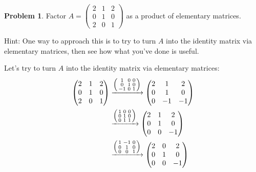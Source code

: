 \documentclass[11pt,oneside]{amsart}
\theoremstyle{definition}
\newtheorem{problem}{Problem}
\begin{document}
    \begin{problem}
        Factor $A=\begin{pmatrix}2&1&2\\0&1&0\\2&0&1\end{pmatrix}$ as a product of elementary matrices.

        Hint: One way to approach this is to try to turn $A$ into the identity matrix via elementary matrices, then see how what you've done is useful.
    \end{problem}
    \begin{solution}
        Let's try to turn $A$ into the identity matrix via elementary matrices:
        \[\begin{split}
            \begin{pmatrix}2&1&2\\0&1&0\\2&0&1\end{pmatrix} &\xrightarrow{\begin{psmallmatrix}1&0&0\\0&1&0\\-1&0&1\end{psmallmatrix}} \begin{pmatrix}
                2&1&2\\
                0&1&0\\
                0&-1&-1
            \end{pmatrix}\\
            &\xrightarrow{\begin{psmallmatrix}1&0&0\\0&1&0\\0&1&1\end{psmallmatrix}}\begin{pmatrix}
                2&1&2\\
                0&1&0\\
                0&0&-1
            \end{pmatrix}\\
            &\xrightarrow{\begin{psmallmatrix}1&-1&0\\0&1&0\\0&0&1\end{psmallmatrix}}\begin{pmatrix}
                2&0&2\\
                0&1&0\\
                0&0&-1
            \end{pmatrix}\\

\end{split}\]
\end{solution}
\end{document}
